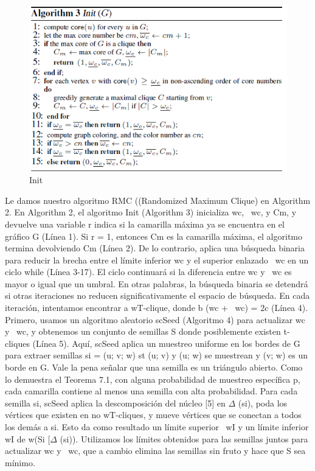 \begin{figure}[h!]
\centering
\includegraphics[scale=1]{img/imagen11.png}
\caption{Init}
\label{Comandos}
\end{figure}
Le damos nuestro algoritmo RMC ((Randomized Maximum Clique) en Algorithm 2. En Algorithm 2, el algoritmo Init (Algorithm 3) inicializa wc, ~wc, y Cm, y devuelve una variable r indica si la camarilla máxima ya se encuentra en el gráfico G (Línea 1). Si r = 1, entonces Cm es la camarilla máxima, el algoritmo termina devolviendo Cm (Línea 2). De lo contrario, aplica una búsqueda binaria para reducir la brecha entre el límite inferior wc y el superior enlazado ~wc en un ciclo while (Línea 3-17). El ciclo continuará si la diferencia entre wc y ~wc es mayor o igual que un umbral. En otras palabras, la búsqueda binaria se detendrá si otras iteraciones no reducen significativamente el espacio de búsqueda. En cada iteración, intentamos encontrar a wT-clique, donde b (wc + ~wc) = 2c (Línea 4). Primero, usamos un algoritmo aleatorio scSeed (Algoritmo 4) para actualizar wc y ~wc, y obtenemos un conjunto de semillas S donde posiblemente existen t-cliques (Línea 5). Aquí, scSeed aplica un muestreo uniforme en los bordes de G para extraer semillas si = (u; v; w) st (u; v) y (u; w) se muestrean y (v; w) es un borde en G. Vale la pena señalar que una semilla es un triángulo abierto. Como lo demuestra el Teorema 7.1, con alguna probabilidad de muestreo específica p, cada camarilla contiene al menos una semilla con alta probabilidad. Para cada semilla si, scSeed aplica la descomposición del núcleo [5] en \begin{math}\Delta\end{math} (si), poda los vértices que existen en no wT-cliques, y mueve vértices que se conectan a todos los demás a si. Esto da como resultado un límite superior ~wI y un límite inferior wI de w(Si [\begin{math}\Delta\end{math} (si)). Utilizamos los límites obtenidos para las semillas juntos para actualizar wc y ~wc, que a cambio elimina las semillas sin fruto y hace que S sea mínimo.

